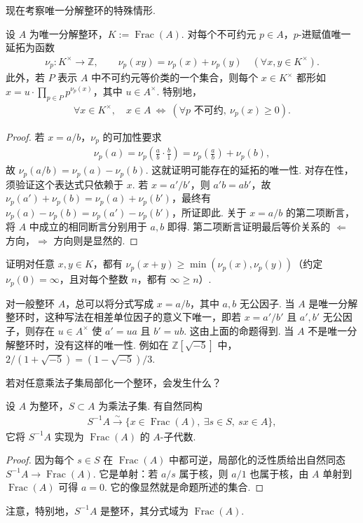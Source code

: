 现在考察唯一分解整环的特殊情形.
\begin{proposition*}
设 $A$ 为唯一分解整环，$K:=\operatorname{Frac}(A)$. 对每个不可约元 $p\in A$，$p$-进赋值唯一延拓为函数
\begin{align*}
\nu_p:K^\times\longrightarrow\mathbb Z,\qquad
\nu_p(xy)=\nu_p(x)+\nu_p(y)\quad(\forall x,y\in K^\times).
\end{align*}
此外，若 $P$ 表示 $A$ 中不可约元等价类的一个集合，则每个 $x\in K^\times$ 都形如 $x=u\cdot\prod_{p\in P}p^{\nu_p(x)}$，其中 $u\in A^\times$. 特别地，
\begin{align*}
\forall x\in K^\times,\quad x\in A\ \Longleftrightarrow\ (\forall p\text{ 不可约},\ \nu_p(x)\geqslant0).
\end{align*}
\end{proposition*}
\begin{proof}
若 $x=a/b$，$\nu_p$ 的可加性要求
\begin{align*}
\nu_p(a)=\nu_p\left(\frac ab\cdot\frac b1\right)=\nu_p\left(\frac ab\right)+\nu_p(b),
\end{align*}
故 $\nu_p(a/b)=\nu_p(a)-\nu_p(b)$. 这就证明可能存在的延拓的唯一性. 对存在性，须验证这个表达式只依赖于 $x$. 若 $x=a'/b'$，则 $a'b=ab'$，故 $\nu_p(a')+\nu_p(b)=\nu_p(a)+\nu_p(b')$，最终有 $\nu_p(a)-\nu_p(b)=\nu_p(a')-\nu_p(b')$，所证即此. 关于 $x=a/b$ 的第二项断言，将 $A$ 中成立的相同断言分别用于 $a,b$ 即得. 第二项断言证明最后等价关系的 $\Leftarrow$ 方向，$\Rightarrow$ 方向则是显然的.
\end{proof}
\begin{exercise*}
证明对任意 $x,y\in K$，都有 $\nu_p(x+y)\geqslant\min(\nu_p(x),\nu_p(y))$（约定 $\nu_p(0)=\infty$，且对每个整数 $n$，都有 $\infty\geqslant n$）.
\end{exercise*}
\begin{remark*}
对一般整环 $A$，总可以将分式写成 $x=a/b$，其中 $a,b$ 无公因子. 当 $A$ 是唯一分解整环时，这种写法在相差单位因子的意义下唯一，即若 $x=a'/b'$ 且 $a',b'$ 无公因子，则存在 $u\in A^\times$ 使 $a'=ua$ 且 $b'=ub$. 这由上面的命题得到. 当 $A$ 不是唯一分解整环时，没有这样的唯一性. 例如在 $\mathbb Z[\sqrt{-5}]$ 中，$2/(1+\sqrt{-5})=(1-\sqrt{-5})/3$.
\end{remark*}
若对任意乘法子集局部化一个整环，会发生什么？
\begin{lemma*}
设 $A$ 为整环，$S\subset A$ 为乘法子集. 有自然同构
\begin{align*}
S^{-1}A\xrightarrow{\sim}\{x\in\operatorname{Frac}(A),\ \exists s\in S,\ sx\in A\},
\end{align*}
它将 $S^{-1}A$ 实现为 $\operatorname{Frac}(A)$ 的 $A$-子代数.
\end{lemma*}
\begin{proof}
因为每个 $s\in S$ 在 $\operatorname{Frac}(A)$ 中都可逆，局部化的泛性质给出自然同态 $S^{-1}A\longrightarrow\operatorname{Frac}(A)$. 它是单射：若 $a/s$ 属于核，则 $a/1$ 也属于核，由 $A$ 单射到 $\operatorname{Frac}(A)$ 可得 $a=0$. 它的像显然就是命题所述的集合.
\end{proof}
注意，特别地，$S^{-1}A$ 是整环，其分式域为 $\operatorname{Frac}(A)$.
